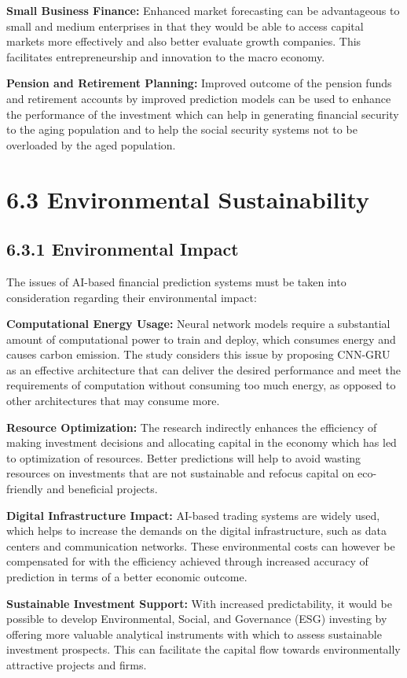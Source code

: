 \documentclass[12pt,a4paper]{report}
\begin{document}
\textbf{Small Business Finance:} Enhanced market forecasting can be advantageous to small and medium enterprises in that they would be able to access capital markets more effectively and also better evaluate growth companies. This facilitates entrepreneurship and innovation to the macro economy.

\textbf{Pension and Retirement Planning:} Improved outcome of the pension funds and retirement accounts by improved prediction models can be used to enhance the performance of the investment which can help in generating financial security to the aging population and to help the social security systems not to be overloaded by the aged population.

\section{6.3 Environmental Sustainability}
\subsection{6.3.1 Environmental Impact}
The issues of AI-based financial prediction systems must be taken into consideration regarding their environmental impact:

\textbf{Computational Energy Usage:} Neural network models require a substantial amount of computational power to train and deploy, which consumes energy and causes carbon emission. The study considers this issue by proposing CNN-GRU as an effective architecture that can deliver the desired performance and meet the requirements of computation without consuming too much energy, as opposed to other architectures that may consume more.

\textbf{Resource Optimization:} The research indirectly enhances the efficiency of making investment decisions and allocating capital in the economy which has led to optimization of resources. Better predictions will help to avoid wasting resources on investments that are not sustainable and refocus capital on eco-friendly and beneficial projects.

\textbf{Digital Infrastructure Impact:} AI-based trading systems are widely used, which helps to increase the demands on the digital infrastructure, such as data centers and communication networks. These environmental costs can however be compensated for with the efficiency achieved through increased accuracy of prediction in terms of a better economic outcome.

\textbf{Sustainable Investment Support:} With increased predictability, it would be possible to develop Environmental, Social, and Governance (ESG) investing by offering more valuable analytical instruments with which to assess sustainable investment prospects. This can facilitate the capital flow towards environmentally attractive projects and firms.
\end{document}
